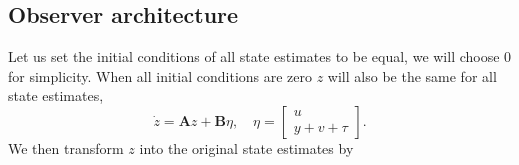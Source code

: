 \subsection{Observer architecture}\label{subsec:ssmo-architecture}
Let us set the initial conditions of all state estimates to be equal, we will choose $0$ for simplicity. When all initial conditions are zero $z$ will also be the same for all state estimates, 
\begin{equation*}
    \dot{z} = \mathbf{A}z + \mathbf{B}\eta, \quad \eta = 
    \begin{bmatrix}
        u \\ y + v + \tau
    \end{bmatrix}.
\end{equation*}
We then transform $z$ into the original state estimates by


